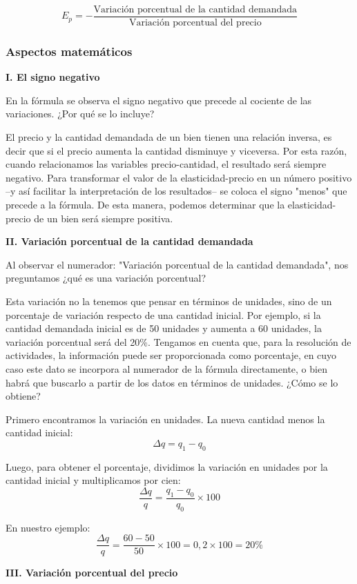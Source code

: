 \documentclass[12pt,a4paper]{article}
\begin{document}
\[
E_p = -\frac{\text{Variación porcentual de la cantidad demandada}}{\text{Variación porcentual del precio}}
\]

\subsubsection{Aspectos matemáticos}

\textbf{I. El signo negativo}

En la fórmula se observa el signo negativo que precede al cociente de las variaciones. ¿Por qué se lo incluye?

El precio y la cantidad demandada de un bien tienen una relación inversa, es decir que si el precio aumenta la cantidad disminuye y viceversa. Por esta razón, cuando relacionamos las variables precio-cantidad, el resultado será siempre negativo. Para transformar el valor de la elasticidad-precio en un número positivo –y así facilitar la interpretación de los resultados– se coloca el signo "menos" que precede a la fórmula. De esta manera, podemos determinar que la elasticidad-precio de un bien será siempre positiva.

\textbf{II. Variación porcentual de la cantidad demandada}

Al observar el numerador: "Variación porcentual de la cantidad demandada", nos preguntamos ¿qué es una variación porcentual?

Esta variación no la tenemos que pensar en términos de unidades, sino de un porcentaje de variación respecto de una cantidad inicial. Por ejemplo, si la cantidad demandada inicial es de 50 unidades y aumenta a 60 unidades, la variación porcentual será del 20\%. Tengamos en cuenta que, para la resolución de actividades, la información puede ser proporcionada como porcentaje, en cuyo caso este dato se incorpora al numerador de la fórmula directamente, o bien habrá que buscarlo a partir de los datos en términos de unidades. ¿Cómo se lo obtiene?

Primero encontramos la variación en unidades. La nueva cantidad menos la cantidad inicial:
\[
\Delta q = q_1 - q_0
\]

Luego, para obtener el porcentaje, dividimos la variación en unidades por la cantidad inicial y multiplicamos por cien:
\[
\frac{\Delta q}{q} = \frac{q_1 - q_0}{q_0} \times 100
\]

En nuestro ejemplo:
\[
\frac{\Delta q}{q} = \frac{60 - 50}{50} \times 100 = 0,2 \times 100 = 20\%
\]

\textbf{III. Variación porcentual del precio}
\end{document}

